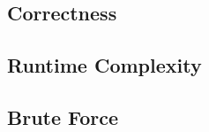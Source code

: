 \documentclass{article}
\begin{document}
\subsection{Correctness}

\subsection{Runtime Complexity}

\subsection{Brute Force}
\end{document}
